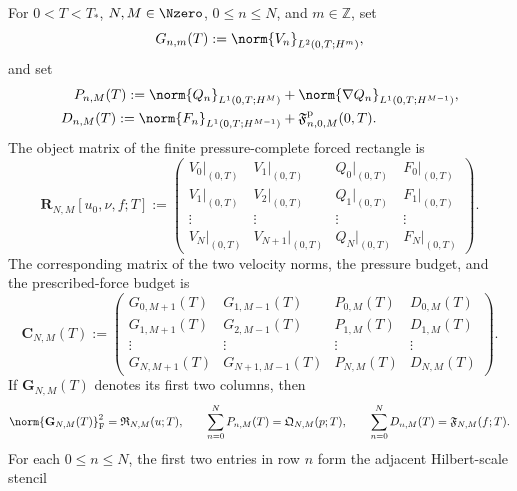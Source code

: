 \begin{proposition}
\label{f:prop:sobolev-rectangle-matrix}
For \(0<T<T_*\), \(N,M\in\Nzero\), \(0\le n\le N\), and
\(m\in\mathbb Z\), set
\[
 G_{n,m}(T):=\norm{V_n}_{L^2(0,T;H^m)},
\]
and set
\begin{align*}
 P_{n,M}(T):=\norm{Q_n}_{L^1(0,T;H^M)}
 &+\norm{\nabla Q_n}_{L^1(0,T;H^{M-1})},\\
 D_{n,M}(T):=\norm{F_n}_{L^1(0,T;H^{M-1})}
 &+\mathfrak F^{\rm p}_{n,0,M}(0,T).
\end{align*}
The object matrix of the finite pressure-complete forced rectangle is
\begin{equation}
 \mathbf R_{N,M}[u_0,\nu,f;T]
 :=
 \begin{pmatrix}
  V_0|_{(0,T)}&V_1|_{(0,T)}&Q_0|_{(0,T)}&F_0|_{(0,T)}\\
  V_1|_{(0,T)}&V_2|_{(0,T)}&Q_1|_{(0,T)}&F_1|_{(0,T)}\\
  \vdots&\vdots&\vdots&\vdots\\
  V_N|_{(0,T)}&V_{N+1}|_{(0,T)}&Q_N|_{(0,T)}&F_N|_{(0,T)}
 \end{pmatrix}.
 \label{f:eq:finite-rectangle-object-matrix}
\end{equation}
The corresponding matrix of the two velocity norms, the pressure budget, and
the prescribed-force budget is
\begin{equation}
 \mathbf C_{N,M}(T)
 :=
 \begin{pmatrix}
  G_{0,M+1}(T)&G_{1,M-1}(T)&P_{0,M}(T)&D_{0,M}(T)\\
  G_{1,M+1}(T)&G_{2,M-1}(T)&P_{1,M}(T)&D_{1,M}(T)\\
  \vdots&\vdots&\vdots&\vdots\\
  G_{N,M+1}(T)&G_{N+1,M-1}(T)&P_{N,M}(T)&D_{N,M}(T)
 \end{pmatrix}.
 \label{f:eq:sobolev-pressure-complete-rectangle-matrix}
\end{equation}
If \(\mathbf G_{N,M}(T)\) denotes its first two columns, then
\begin{equation}
 \norm{\mathbf G_{N,M}(T)}_{\mathrm F}^2
 =\mathfrak R_{N,M}(u;T),
 \qquad
 \sum_{n=0}^NP_{n,M}(T)=\mathfrak Q_{N,M}(p;T),
 \qquad
 \sum_{n=0}^ND_{n,M}(T)=\mathfrak F_{N,M}(f;T).
 \label{f:eq:rectangle-matrix-norm-identities}
\end{equation}
For each \(0\le n\le N\), the first two entries in row \(n\) form the
adjacent Hilbert-scale stencil
\begin{equation}
 \left.
 \begin{array}{c}

\end{array}
\end{equation}
\end{proposition}
